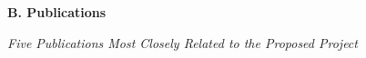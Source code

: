 




\vspace{6pt}
\noindent
\textbf{B.  Publications}

\emph{Five Publications Most Closely Related to the Proposed Project}
\vspace{4pt}


